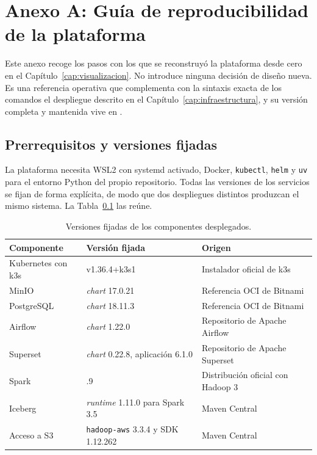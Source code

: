 \chapter*{Anexo A: Guía de reproducibilidad de la plataforma}
\label{cap:anexo_reproduccion}

\setcounter{section}{0}
\renewcommand{\thesection}{A.\arabic{section}}
\setcounter{code}{0}
\renewcommand{\thecode}{A.\arabic{code}}

Este anexo recoge los pasos con los que se reconstruyó la plataforma desde
cero en el Capítulo~\ref{cap:visualizacion}. No introduce ninguna decisión
de diseño nueva. Es una referencia operativa que complementa con la sintaxis
exacta de los comandos el despliegue descrito en el
Capítulo~\ref{cap:infraestructura}, y su versión completa y mantenida vive
en .

\section{Prerrequisitos y versiones fijadas}
\label{sec:anexo_reproduccion_prerrequisitos}

La plataforma necesita WSL2 con systemd activado, Docker, \texttt{kubectl},
\texttt{helm} y \texttt{uv} para el entorno Python del propio repositorio.
Todas las versiones de los servicios se fijan de forma explícita, de modo
que dos despliegues distintos produzcan el mismo sistema. La
Tabla~\ref{tab:anexo_versiones} las reúne.

\begin{table}[H]
  \centering
  \small
  \renewcommand{\arraystretch}{1.15}
  \begin{tabular}{
    >{\raggedright\arraybackslash}p{}
    >{\raggedright\arraybackslash}p{}
    >{\raggedright\arraybackslash}p{}}
    \hline
    \textbf{Componente} & \textbf{Versión fijada} & \textbf{Origen} \\
    \hline
    Kubernetes con k3s & v1.36.4+k3s1 & Instalador oficial de k3s \\
    MinIO & \textit{chart} 17.0.21 & Referencia OCI de Bitnami \\
    PostgreSQL & \textit{chart} 18.11.3 & Referencia OCI de Bitnami \\
    Airflow & \textit{chart} 1.22.0 & Repositorio de Apache Airflow \\
    Superset & \textit{chart} 0.22.8, aplicación 6.1.0 & Repositorio de Apache Superset \\
    Spark & 3.5.9 & Distribución oficial con Hadoop 3 \\
    Iceberg & \textit{runtime} 1.11.0 para Spark 3.5 & Maven Central \\
    Acceso a S3 & \texttt{hadoop-aws} 3.3.4 y SDK 1.12.262 & Maven Central \\
    \hline
  \end{tabular}
  \caption{Versiones fijadas de los componentes desplegados.}
  \label{tab:anexo_versiones}
\end{table}

